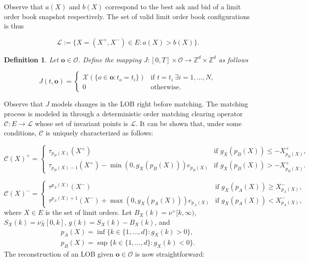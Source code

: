 \documentclass[10pt,a4paper,oneside]{article}
\newcommand{\Z}{\mathbb{Z}}
\newcommand{\Bo}{\mathcal{L}}
\newtheorem{definition}{Definition}
\begin{document}
Observe that $a(X)$ and $b(X)$ correspond to the best ask and bid of a limit order book snapshot respectively. The set of valid limit order book configurations is thus

$$
\Bo := \{X = (X^+, X^-) \in E : a(X) > b(X)\}.
$$

\begin{definition}
    Let $\mathbf{o} \in \mathcal{O}$. Define the mapping $J : [0, T] \times \mathcal{O} \rightarrow \Z^d \times \Z^d$ as follows

    \begin{equation*}
    J(t, \mathbf{o}) = \begin{cases}
        \mathcal{X}(\{ o \in \mathbf{o} : t_o = t_i  \}) & \text{if } t = t_{i} \ \exists  i = 1, \dots, N,\\
        0                        & \text{otherwise.}
    \end{cases}
\end{equation*}
    
\end{definition}

Observe that $J$ models changes in the LOB right before matching. The matching process is modeled in \cite{cont2023mathematical} through a deterministic order matching clearing operator $\mathcal{C} : E \rightarrow \Bo$ whose set of invariant points is $\Bo$. It can be shown that, under some conditions, $\mathcal{C}$ is uniquely characterized as follows:

\begin{equation*}
    \mathcal{C}(X)^+ = \begin{cases}
        \tau_{p_B(X)}(X^+)                                       & \text{if } g_X(p_B(X)) \leq - X^+_{p_B(X)}, \\
        \tau_{p_B(X) - 1}(X^+) - \min(0, g_X(p_B(X))) e_{p_B(X)} & \text{if } g_X(p_B(X)) > - X^+_{p_B(X)}.
    \end{cases}
\end{equation*}

\begin{equation*}
    \mathcal{C}(X)^- = \begin{cases}
        \tau^{p_A(X)}(X^-)                                       & \text{if } g_X(p_A(X)) \geq X^-_{p_A(X)}, \\
        \tau^{p_A(X) + 1}(X^-) + \max(0, g_X(p_A(X))) e_{p_A(X)} & \text{if } g_X(p_A(X)) <  X^-_{p_A(X)},
    \end{cases}
\end{equation*}
where $X \in E$ is the set of limit orders. Let $B_X(k) = \nu^+[k, \infty)$, $S_X(k) = \nu^-_X[0, k]$, $g(k) = S_X(k) - B_X(k)$, and
\begin{align*}
    p_A(X) = \inf \{ k \in \{1, \dots, d \} : g_X(k) > 0 \},\\
    p_B(X) = \sup \{ k \in \{1, \dots, d \} : g_X(k) < 0 \}.
\end{align*}
The reconstruction of an LOB given $\mathbf{o} \in  \mathcal{O}$ is now straightforward:
\end{document}
